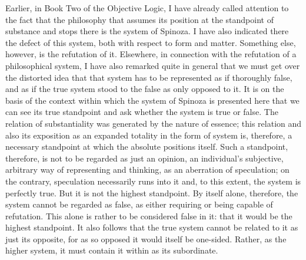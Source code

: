 Earlier, in Book Two of the Objective Logic,
I have already called attention to the fact that
the philosophy that assumes its position
at the standpoint of substance and stops there
is the system of Spinoza.
I have also indicated there the defect of this system,
both with respect to form and matter.
Something else, however, is the refutation of it.
Elsewhere, in connection with the
refutation of a philosophical system,
I have also remarked quite in general
that we must get over the distorted idea
that that system has to be represented
as if thoroughly false,
and as if the true system stood
to the false as only opposed to it.
It is on the basis of the context within which
the system of Spinoza is presented here that
we can see its true standpoint
and ask whether the system is true or false.
The relation of substantiality was
generated by the nature of essence;
this relation and also its exposition
as an expanded totality in the form of system
is, therefore, a necessary standpoint
at which the absolute positions itself.
Such a standpoint, therefore, is not
to be regarded as just an opinion,
an individual's subjective, arbitrary
way of representing and thinking,
as an aberration of speculation;
on the contrary, speculation necessarily runs into it
and, to this extent, the system is perfectly true.
But it is not the highest standpoint.
By itself alone, therefore, the system
cannot be regarded as false,
as either requiring or being capable of refutation.
This alone is rather to be considered false in it:
that it would be the highest standpoint.
It also follows that the true system cannot be
related to it as just its opposite,
for as so opposed it would itself be one-sided.
Rather, as the higher system, it must contain
it within as its subordinate.

